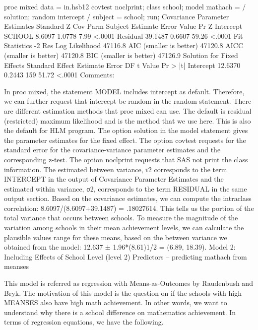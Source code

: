 proc mixed data = in.hsb12 covtest noclprint;
   class school;
   model mathach = / solution;
   random intercept / subject = school;
run;   
                  Covariance Parameter Estimates
                                     Standard         Z
Cov Parm      Subject    Estimate       Error     Value        Pr Z
Intercept     SCHOOL       8.6097      1.0778      7.99      <.0001
Residual                  39.1487      0.6607     59.26      <.0001
           Fit Statistics
-2 Res Log Likelihood         47116.8
AIC (smaller is better)       47120.8
AICC (smaller is better)      47120.8
BIC (smaller is better)       47126.9
                   Solution for Fixed Effects
                         Standard
Effect       Estimate       Error      DF    t Value    Pr > |t|
Intercept     12.6370      0.2443     159      51.72      <.0001
Comments:

In proc mixed, the statement MODEL includes intercept as default. Therefore, we can further request that intercept be random in the random statement.
There are different estimation methods that proc mixed can use. The default is residual (restricted) maximum likelihood and is the method that we use here. This is also the default for HLM program.
The option solution in the model statement gives the parameter estimates for the fixed effect.   
The option covtest requests for the standard error for the covariance-variance parameter estimates and the corresponding z-test.
The option noclprint requests that SAS not print the class information.
The estimated between variance,  τ2 corresponds to the term INTERCEPT in the output of Covariance Parameter Estimates and the estimated within variance, σ2, corresponds to the term RESIDUAL in the same output section.
Based on the covariance estimates, we can compute the intraclass correlation:  8.6097/(8.6097+39.1487) = .18027614. This tells us the portion of the total variance that occurs between schools.
To measure the magnitude of the variation among schools in their mean achievement levels, we can calculate the plausible values range for these means, based on the between variance we obtained from the model: 12.637 ± 1.96*(8.61)1/2 = (6.89, 18.39).
Model 2: Including Effects of School Level (level 2) Predictors -- predicting mathach from meanses

This model is referred as regression with Means-as-Outcomes by Raudenbush and Bryk. The motivation of this model is the question on if the schools with high MEANSES also have high math achievement. In other words, we want to understand why there is a school difference on mathematics achievement. In terms of regression equations, we have the following.

